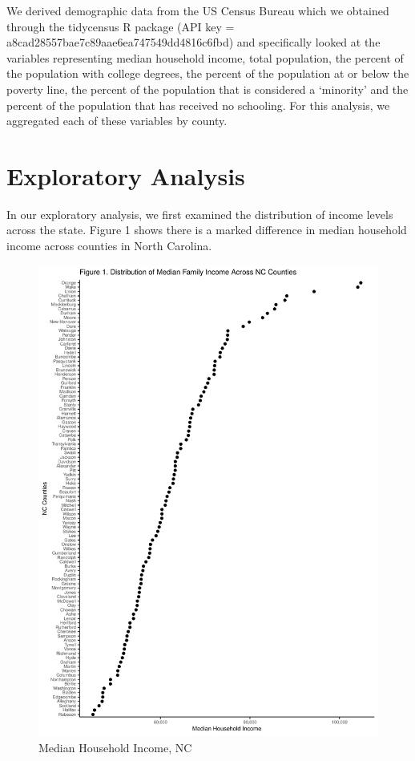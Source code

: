 \documentclass[
  12pt,
]{article}
\begin{document}
We derived demographic data from the US Census Bureau which we obtained
through the tidycensus R package (API key =
a8cad28557bae7c89aae6ea747549dd4816c6fbd) and specifically looked at the
variables representing median household income, total population, the
percent of the population with college degrees, the percent of the
population at or below the poverty line, the percent of the population
that is considered a `minority' and the percent of the population that
has received no schooling. For this analysis, we aggregated each of
these variables by county.

\newpage

\hypertarget{exploratory-analysis}{%
\section{Exploratory Analysis}\label{exploratory-analysis}}

In our exploratory analysis, we first examined the distribution of
income levels across the state. Figure 1 shows there is a marked
difference in median household income across counties in North Carolina.

\begin{figure}
\centering
\includegraphics{Project_files/figure-latex/unnamed-chunk-1-1.pdf}
\caption{Median Household Income, NC}
\end{figure}
\end{document}
